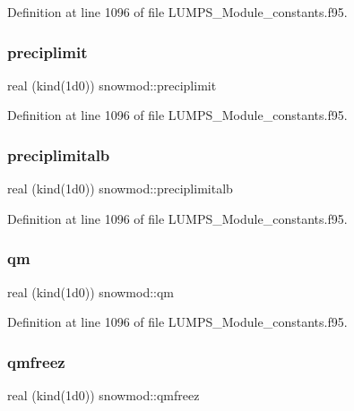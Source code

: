 Definition at line 1096 of file L\+U\+M\+P\+S\+\_\+\+Module\+\_\+constants.\+f95.

\mbox{\label{namespacesnowmod_a9e24791cb966600bc8e20739bc1f36b3}} 
\subsubsection{\texorpdfstring{preciplimit}{preciplimit}}
{\footnotesize\ttfamily real (kind(1d0)) snowmod\+::preciplimit}



Definition at line 1096 of file L\+U\+M\+P\+S\+\_\+\+Module\+\_\+constants.\+f95.

\mbox{\label{namespacesnowmod_a5dcda7794eeea3753a3f14cd6fdf47b8}} 
\subsubsection{\texorpdfstring{preciplimitalb}{preciplimitalb}}
{\footnotesize\ttfamily real (kind(1d0)) snowmod\+::preciplimitalb}



Definition at line 1096 of file L\+U\+M\+P\+S\+\_\+\+Module\+\_\+constants.\+f95.

\mbox{\label{namespacesnowmod_a1d7e7d0b8974783e0320cde393e09594}} 
\subsubsection{\texorpdfstring{qm}{qm}}
{\footnotesize\ttfamily real (kind(1d0)) snowmod\+::qm}



Definition at line 1096 of file L\+U\+M\+P\+S\+\_\+\+Module\+\_\+constants.\+f95.

\mbox{\label{namespacesnowmod_adbb58215814d438f2486f880958737be}} 
\subsubsection{\texorpdfstring{qmfreez}{qmfreez}}
{\footnotesize\ttfamily real (kind(1d0)) snowmod\+::qmfreez}



